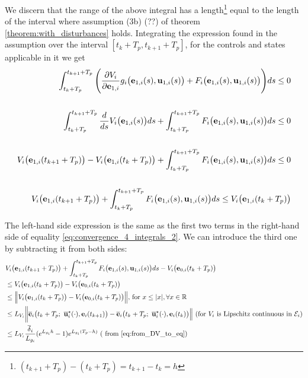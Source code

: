 \begin{gg_box}
  We discern that the range of the above integral has a length\footnote{$(t_{k+1} + T_p) - (t_k + T_p) = t_{k+1} - t_k = h$}
  equal to the length of the interval where assumption (3b) (??) of theorem
  \eqref{theorem:with_disturbances} holds.
  Integrating the expression found in the assumption over the
  interval $[t_k + T_p, t_{k+1} + T_p]$, for the controls and states applicable
  in it we get
  \begin{align}
    \int_{t_k + T_p}^{t_{k+1} + T_p} \Bigg(\dfrac{\partial V_i}{\partial \bm{\mathbf{e}}_{1,i}} g_i\big(\bm{\mathbf{e}}_{1,i}(s), \bm{\mathbf{u}}_{1,i}(s)\big)
    + F_i\big(\bm{\mathbf{e}}_{1,i}(s), \bm{\mathbf{u}}_{1,i}(s)\big)\Bigg) ds \leq 0 \\\\
    \int_{t_k + T_p}^{t_{k+1} + T_p} \dfrac{d}{ds} V_i\big(\bm{\mathbf{e}}_{1,i}(s)\big) d s
    + \int_{t_k + T_p}^{t_{k+1} + T_p} F_i\big(\bm{\mathbf{e}}_{1,i}(s), \bm{\mathbf{u}}_{1,i}(s)\big) ds \leq 0 \\\\
    V_i\big(\bm{\mathbf{e}}_{1,i}(t_{k+1} + T_p)\big) - V_i\big(\bm{\mathbf{e}}_{1,i}(t_k + T_p)\big)
    + \int_{t_k + T_p}^{t_{k+1} + T_p} F_i\big(\bm{\mathbf{e}}_{1,i}(s), \bm{\mathbf{u}}_{1,i}(s)\big) ds \leq 0 \\\\
    V_i\big(\bm{\mathbf{e}}_{1,i}(t_{k+1} + T_p)\big)
    + \int_{t_k + T_p}^{t_{k+1} + T_p} F_i\big(\bm{\mathbf{e}}_{1,i}(s), \bm{\mathbf{u}}_{1,i}(s)\big) ds \leq V_i\big(\bm{\mathbf{e}}_{1,i}(t_k + T_p)\big)
  \end{align}

  The left-hand side expression is the same as the first two terms in the
  right-hand side of equality \eqref{eq:convergence_4_integrals_2}. We can
  introduce the third one by subtracting it from both sides:
  \begin{align}
    &V_i\big(\vect{e}_{1,i}(t_{k+1} + T_p)\big)
    + \int_{t_k + T_p}^{t_{k+1} + T_p} F_i\big(\vect{e}_{1,i}(s), \vect{u}_{1,i}(s)\big) ds
    - V_i\big(\vect{e}_{0,i}(t_k + T_p)\big) \\
    &\leq V_i\big(\vect{e}_{1,i}(t_k + T_p)\big)
    - V_i\big(\vect{e}_{0,i}(t_k + T_p)\big) \\
    &\leq \Big\|V_i\big(\vect{e}_{1,i}(t_k + T_p)\big)
    - V_i\big(\vect{e}_{0,i}(t_k + T_p)\big)\Big\| \text{, for } x \leq |x|, \forall x \in \mathbb{R} \\
    &\leq L_{V_i}\bigg \|\overline{\vect{e}}_i\big(t_k + T_p;\ \overline{\vect{u}}_i^{\star}(\cdot), \vect{e}_i(t_{k+1})\big)
    - \overline{\vect{e}}_i\big(t_k + T_p;\ \overline{\vect{u}}_i^{\star}(\cdot), \vect{e}_i(t_k) \big)\Big\|
    \text{ (for } V_i \text{ is Lipschitz continuous in } \mathcal{E}_i \text{)} \\
    &\leq L_{V_i} \dfrac{\overline{\delta}_i}{L_{g_i}} (e^{L_{g_i}h} - 1) e^{L_{g_i} (T_p - h)} \text{ ( from \eqref{eq:from_DV_to_eq})}
  \end{align}
\end{gg_box}
